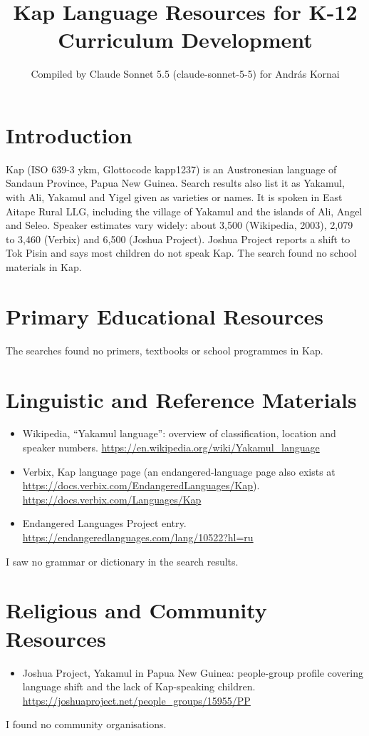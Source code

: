 \documentclass[12pt]{article}
\title{Kap Language Resources for K-12 Curriculum Development}
\author{Compiled by Claude Sonnet 5.5 (claude-sonnet-5-5) for Andr\'as Kornai}
\date{}
\begin{document}
\maketitle

\section{Introduction}
Kap (ISO 639-3 ykm, Glottocode kapp1237) is an Austronesian language of Sandaun Province, Papua New Guinea. Search results also list it as Yakamul, with Ali, Yakamul and Yigel given as varieties or names. It is spoken in East Aitape Rural LLG, including the village of Yakamul and the islands of Ali, Angel and Seleo. Speaker estimates vary widely: about 3,500 (Wikipedia, 2003), 2,079 to 3,460 (Verbix) and 6,500 (Joshua Project). Joshua Project reports a shift to Tok Pisin and says most children do not speak Kap. The search found no school materials in Kap.

\section{Primary Educational Resources}
The searches found no primers, textbooks or school programmes in Kap.

\section{Linguistic and Reference Materials}
\begin{itemize}
\item Wikipedia, ``Yakamul language'': overview of classification, location and speaker numbers. \url{https://en.wikipedia.org/wiki/Yakamul_language}
\item Verbix, Kap language page (an endangered-language page also exists at \url{https://docs.verbix.com/EndangeredLanguages/Kap}). \url{https://docs.verbix.com/Languages/Kap}
\item Endangered Languages Project entry. \url{https://endangeredlanguages.com/lang/10522?hl=ru}
\end{itemize}
I saw no grammar or dictionary in the search results.

\section{Religious and Community Resources}
\begin{itemize}
\item Joshua Project, Yakamul in Papua New Guinea: people-group profile covering language shift and the lack of Kap-speaking children. \url{https://joshuaproject.net/people_groups/15955/PP}
\end{itemize}
I found no community organisations.
\end{document}
